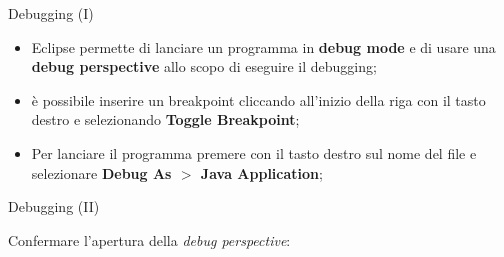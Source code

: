\begin{frame}{Debugging (I)}

  \begin{itemize}
   \item Eclipse permette di lanciare un programma in \textbf{debug mode} e di usare una \textbf{debug perspective}
   allo scopo di eseguire il debugging;
   \item è possibile inserire un breakpoint cliccando all'inizio della riga con il tasto destro e selezionando
   \textbf{Toggle Breakpoint};
  \end{itemize}
  
  \begin{center}
  \end{center}

  \begin{itemize}
   \item Per lanciare il programma premere con il tasto destro sul nome del file e selezionare
   \textbf{Debug As $>$ Java Application};
  \end{itemize}

\end{frame}

{
  
}

\begin{frame}{Debugging (II)}

  Confermare l'apertura della \emph{debug perspective}:
  \begin{center}
  \end{center}

\end{frame}

{
  
}


